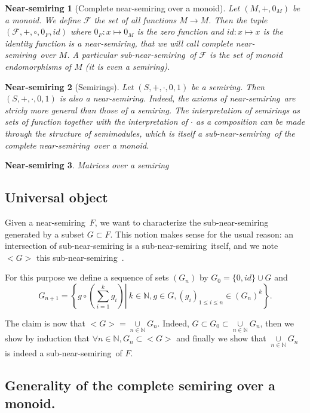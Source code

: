 \documentclass[11pt,a4paper]{article}
\newcommand{\bb}[1]{\mathbb{#1}}
\newcommand{\mcal}[1]{\mathcal{#1}}
\newcommand{\N}{\bb{N}}
\newcommand{\Ns}{near-semiring}
\newcommand{\sns}{sub-near-semiring}
\newtheorem{ns}{Near-semiring}
\renewcommand{\leq}{\leqslant}
\begin{document}
\begin{ns}[Complete near-semiring over a monoid]
\label{ns:ns_over_a_monoid}
	Let $(M,+,0_M)$ be a monoid. We define $\mcal{F}$ the set of all functions $M \to M$. Then the tuple $(\mcal{F},+,\circ,0_F,id)$ where $0_F : x \mapsto 0_M$ is the zero function and $id : x \mapsto x$ is the identity function is a near-semiring, that we will call complete \Ns\ over $M$. A particular sub-\Ns\ of $\mcal{F}$ is the set of monoid endomorphisms of $M$ (it is even a semiring).
\end{ns}

\begin{ns}[Semirings]
\label{ns:semirings}
	Let $(S,+,\cdot,0,1)$ be a semiring. Then $(S,+,\cdot,0,1)$ is also a \Ns . Indeed, the axioms of \Ns\ are stricly more general than those of a semiring. The interpretation of semirings as sets of function together with the interpretation of $\cdot$ as a composition can be made through the structure of semimodules, which is itself a sub-\Ns\ of the complete \Ns\ over a monoid.
\end{ns}

\begin{ns}{Matrices over a semiring}

\end{ns}

\subsection{Universal object}

Given a \Ns\ $F$, we want to characterize the sub-near-semiring generated by a subset $G \subset F$. This notion makes sense for the usual reason: an intersection of sub-near-semiring is a \sns\ itself, and we note $<G>$ this \sns\ .

For this purpose we define a sequence of sets $(G_n)$ by $G_0=\{0,id\} \cup G$ and 
$$G_{n+1} = \left\{ \left. g \circ \left( \overset{k}{\underset{i=1}{\sum}} g_i \right) \right| \ k \in \N, g \in G, (g_i)_{1 \leq i \leq n} \in (G_n)^k \right\} .$$

	The claim is now that $<G> = \underset{n \in \N}{\cup} G_n$. Indeed, $G \subset G_0 \subset \underset{n \in \N}{\cup} G_n$, then we show by induction that $\forall n \in \N, G_n \subset <G>$ and finally we show that $\underset{n \in \N}{\cup} G_n$ is indeed a \sns\ of $F$.

\subsection{Generality of the complete semiring over a monoid.}
\end{document}
